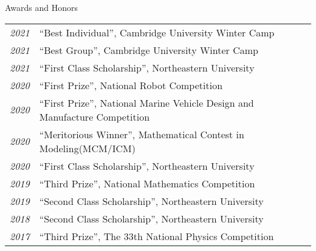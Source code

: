 \begin{rSection}{Awards and Honors}
    \begin{tabular}{ @{} >{\itshape}l @{\hspace{6ex}} l }
    2021        & ``Best Individual'', Cambridge University Winter Camp\\  
    2021        & ``Best Group'', Cambridge University Winter Camp\\  
    2021        & ``First Class Scholarship'', Northeastern University\\
    2020        & ``First Prize'', National Robot Competition\\
    2020        & ``First Prize'', National Marine Vehicle Design and Manufacture Competition\\
    2020        & ``Meritorious Winner'', Mathematical Contest in Modeling(MCM/ICM)\\
    2020        & ``First Class Scholarship'', Northeastern University\\
    2019        & ``Third Prize'', National Mathematics Competition\\
    2019        & ``Second Class Scholarship'', Northeastern University\\
    2018        & ``Second Class Scholarship'', Northeastern University\\
	2017        & ``Third Prize'', The 33th National Physics Competition\\
    \end{tabular}
\end{rSection}
